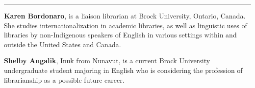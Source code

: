 \begin{center}\rule{0.5\linewidth}{\linethickness}\end{center}

\textbf{Karen Bordonaro}, is a liaison librarian at Brock University,
Ontario, Canada. She studies internationalization in academic libraries,
as well as linguistic uses of libraries by non-Indigenous speakers of
English in various settings within and outside the United States and
Canada.

\textbf{Shelby Angalik}, Inuk from Nunavut, is a current Brock
University undergraduate student majoring in English who is considering
the profession of librarianship as a possible future career.
